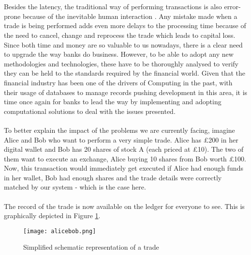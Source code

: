 \documentclass[12pt,twoside]{article}
\begin{document}
\\ \\
Besides the latency, the traditional way of performing transactions is also error-prone because of the inevitable human interaction \cite{humanrisk}. Any mistake made when a trade is being performed adds even more delays to the processing time because of the need to cancel, change and reprocess the trade which leads to capital loss. Since both time and money are so valuable to us nowadays, there is a clear need to upgrade the way banks do business. However, to be able to adopt any new methodologies and technologies, these have to be thoroughly analysed to verify they can be held to the standards required by the financial world. Given that the financial industry has been one of the drivers of Computing in the past, with their usage of databases to manage records pushing development in this area, it is time once again for banks to lead the way by implementing and adopting computational solutions to deal with the issues presented.
\\ \\
To better explain the impact of the problems we are currently facing, imagine Alice and Bob who want to perform a very simple trade. Alice has \pounds 200 in her digital wallet and Bob has 20 shares of stock A (each priced at \pounds 10). The two of them want to execute an exchange, Alice buying 10 shares from Bob worth \pounds 100. Now, this transaction would immediately get executed if Alice had enough funds in her wallet, Bob had enough shares and the trade details were correctly matched by our system - which is the case here.
\\ \\
The record of the trade is now available on the ledger for everyone to see. This is graphically depicted in Figure \ref{fig:tradescheme}.
 
\begin{figure}[H]
\centering
\texttt{[image: alicebob.png]}
\caption{Simplified schematic representation of a trade}
\centering
\label{fig:tradescheme}
\end{figure}
\end{document}
